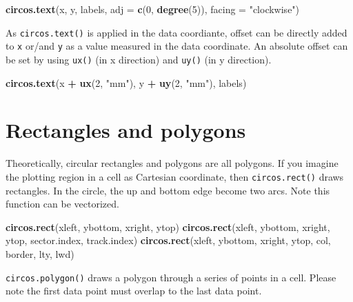 \documentclass[]{book}
\newenvironment{Shaded}{\begin{snugshade}}{\end{snugshade}}
\newcommand{\KeywordTok}[1]{\textcolor[rgb]{0.13,0.29,0.53}{\textbf{#1}}}
\newcommand{\DataTypeTok}[1]{\textcolor[rgb]{0.13,0.29,0.53}{#1}}
\newcommand{\DecValTok}[1]{\textcolor[rgb]{0.00,0.00,0.81}{#1}}
\newcommand{\StringTok}[1]{\textcolor[rgb]{0.31,0.60,0.02}{#1}}
\newcommand{\OperatorTok}[1]{\textcolor[rgb]{0.81,0.36,0.00}{\textbf{#1}}}
\newcommand{\NormalTok}[1]{#1}
\begin{document}
\begin{Shaded}
\begin{Highlighting}[]
\KeywordTok{circos.text}\NormalTok{(x, y, labels, }\DataTypeTok{adj =} \KeywordTok{c}\NormalTok{(}\DecValTok{0}\NormalTok{, }\KeywordTok{degree}\NormalTok{(}\DecValTok{5}\NormalTok{)), }\DataTypeTok{facing =} \StringTok{"clockwise"}\NormalTok{)}
\end{Highlighting}
\end{Shaded}

As \texttt{circos.text()} is applied in the data coordiante, offset can
be directly added to \texttt{x} or/and \texttt{y} as a value measured in
the data coordinate. An absolute offset can be set by using
\texttt{ux()} (in x direction) and \texttt{uy()} (in y direction).

\begin{Shaded}
\begin{Highlighting}[]
\KeywordTok{circos.text}\NormalTok{(x }\OperatorTok{+}\StringTok{ }\KeywordTok{ux}\NormalTok{(}\DecValTok{2}\NormalTok{, }\StringTok{"mm"}\NormalTok{), y }\OperatorTok{+}\StringTok{ }\KeywordTok{uy}\NormalTok{(}\DecValTok{2}\NormalTok{, }\StringTok{"mm"}\NormalTok{), labels)}
\end{Highlighting}
\end{Shaded}

\section{Rectangles and polygons}\label{rectangles}

Theoretically, circular rectangles and polygons are all polygons. If you
imagine the plotting region in a cell as Cartesian coordinate, then
\texttt{circos.rect()} draws rectangles. In the circle, the up and
bottom edge become two arcs. Note this function can be vectorized.

\begin{Shaded}
\begin{Highlighting}[]
\KeywordTok{circos.rect}\NormalTok{(xleft, ybottom, xright, ytop)}
\KeywordTok{circos.rect}\NormalTok{(xleft, ybottom, xright, ytop, sector.index, track.index)}
\KeywordTok{circos.rect}\NormalTok{(xleft, ybottom, xright, ytop, col, border, lty, lwd)}
\end{Highlighting}
\end{Shaded}

\texttt{circos.polygon()} draws a polygon through a series of points in
a cell. Please note the first data point must overlap to the last data
point.
\end{document}
